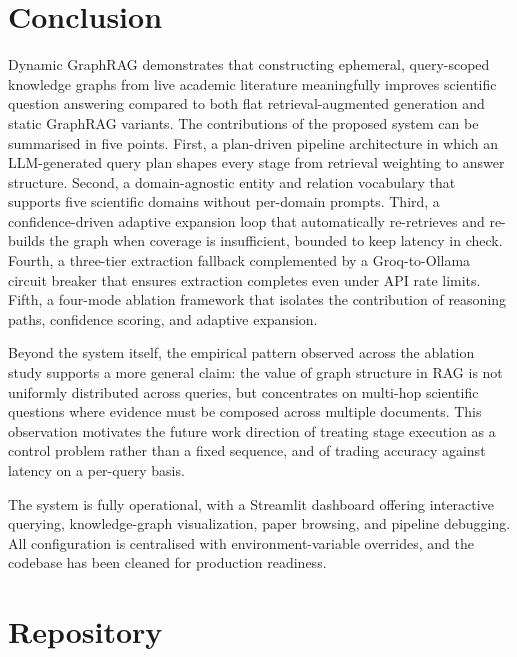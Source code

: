 \documentclass[11pt,a4paper]{article}
\begin{document}
\section{Conclusion}

Dynamic GraphRAG demonstrates that constructing ephemeral, query-scoped
knowledge graphs from live academic literature meaningfully improves
scientific question answering compared to both flat retrieval-augmented
generation and static GraphRAG variants. The contributions of the proposed
system can be summarised in five points. First, a plan-driven pipeline
architecture in which an LLM-generated query plan shapes every stage from
retrieval weighting to answer structure. Second, a domain-agnostic entity
and relation vocabulary that supports five scientific domains without
per-domain prompts. Third, a confidence-driven adaptive expansion loop that
automatically re-retrieves and re-builds the graph when coverage is
insufficient, bounded to keep latency in check. Fourth, a three-tier
extraction fallback complemented by a Groq-to-Ollama circuit breaker that
ensures extraction completes even under API rate limits. Fifth, a four-mode
ablation framework that isolates the contribution of reasoning paths,
confidence scoring, and adaptive expansion.

Beyond the system itself, the empirical pattern observed across the ablation
study supports a more general claim: the value of graph structure in RAG is
not uniformly distributed across queries, but concentrates on multi-hop
scientific questions where evidence must be composed across multiple
documents. This observation motivates the future work direction of
treating stage execution as a control problem rather than a fixed sequence,
and of trading accuracy against latency on a per-query basis.

The system is fully operational, with a Streamlit dashboard offering
interactive querying, knowledge-graph visualization, paper browsing, and
pipeline debugging. All configuration is centralised with environment-variable
overrides, and the codebase has been cleaned for production readiness.

\section*{Repository}
\end{document}
